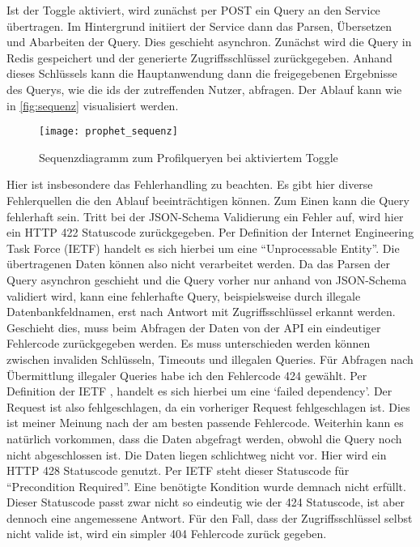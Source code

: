 Ist der Toggle aktiviert, wird zunächst per POST ein Query an den Service übertragen. Im Hintergrund initiiert der Service dann das Parsen, Übersetzen und Abarbeiten der Query. Dies geschieht asynchron. Zunächst wird die Query in Redis gespeichert und der generierte Zugriffsschlüssel zurückgegeben.
Anhand dieses Schlüssels kann die Hauptanwendung dann die freigegebenen Ergebnisse des Querys, wie die ids der zutreffenden Nutzer, abfragen. Der Ablauf kann wie in \autoref{fig:sequenz} visualisiert werden.

\begin{figure}[!ht]
    \centering
    \caption{Sequenzdiagramm zum Profilqueryen bei aktiviertem Toggle}
    \label{fig:sequenz}
    \texttt{[image: prophet\_sequenz]}
\end{figure}

Hier ist insbesondere das Fehlerhandling zu beachten. Es gibt hier diverse Fehlerquellen die den Ablauf beeinträchtigen können. Zum Einen kann die Query fehlerhaft sein. 
Tritt bei der JSON-Schema Validierung ein Fehler auf, wird hier ein HTTP 422 Statuscode zurückgegeben. Per Definition der Internet Engineering Task Force (IETF) \cite{ietf:424} handelt es sich hierbei um eine ``Unprocessable Entity''. Die übertragenen Daten können also nicht verarbeitet werden.
Da das Parsen der Query asynchron geschieht und die Query vorher nur anhand von JSON-Schema validiert wird, kann eine fehlerhafte Query, beispielsweise durch illegale Datenbankfeldnamen, erst nach Antwort mit Zugriffsschlüssel erkannt werden. Geschieht dies, muss beim Abfragen der Daten von der API ein eindeutiger Fehlercode zurückgegeben werden. Es muss unterschieden werden können zwischen invaliden Schlüsseln, Timeouts und illegalen Queries. Für Abfragen nach Übermittlung illegaler Queries habe ich den Fehlercode 424 gewählt. Per Definition der IETF \cite{ietf:424}, handelt es sich hierbei um eine `failed dependency'. Der Request ist also fehlgeschlagen, da ein vorheriger Request fehlgeschlagen ist. Dies ist meiner Meinung nach der am besten passende Fehlercode.
Weiterhin kann es natürlich vorkommen, dass die Daten abgefragt werden, obwohl die Query noch nicht abgeschlossen ist. Die Daten liegen schlichtweg nicht vor. Hier wird ein HTTP 428 Statuscode genutzt. Per IETF \cite{ietf:428} steht dieser Statuscode für ``Precondition Required''. Eine benötigte Kondition wurde demnach nicht erfüllt. Dieser Statuscode passt zwar nicht so eindeutig wie der 424 Statuscode, ist aber dennoch eine angemessene Antwort.
Für den Fall, dass der Zugriffsschlüssel selbst nicht valide ist, wird ein simpler 404 Fehlercode zurück gegeben.

